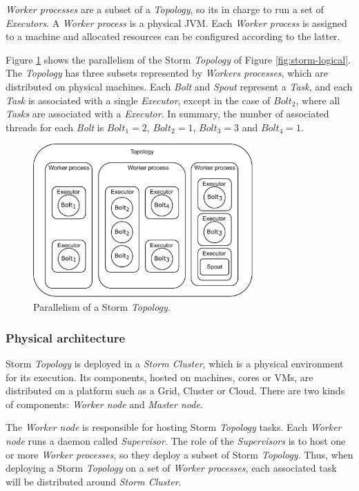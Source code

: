 \textit{Worker processes} are a subset of a \textit{Topology}, so its in charge to run a set of \textit{Executors}. A \textit{Worker process} is a physical JVM. Each \textit{Worker process} is assigned to a machine and allocated resources can be configured according to the latter.

Figure \ref{fig:storm-parallelism} shows the parallelism of the Storm \textit{Topology} of Figure \ref{fig:storm-logical}. The \textit{Topology} has three subsets represented by \textit{Workers processes}, which are distributed on physical machines. Each \textit{Bolt} and \textit{Spout} represent a \textit{Task}, and each \textit{Task} is associated with a single \textit{Executor}, except in the case of $Bolt_2$, where all \textit{Tasks} are associated with a \textit{Executor}. In summary, the number of associated threads for each \textit{Bolt} is $Bolt_1 = 2$, $Bolt_2 = 1$, $Bolt_3 = 3$ and $Bolt_4 = 1$.

\begin{figure}[!ht]
    \centering
    \includegraphics[width=0.75\textwidth]{figures/concepts/Storm-Logical-Parallelism.pdf}
    \caption{Parallelism of a Storm \textit{Topology}.}
    \label{fig:storm-parallelism}
\end{figure}

\subsubsection{Physical architecture}

Storm \textit{Topology} is deployed in a \textit{Storm Cluster}, which is a physical environment for its execution. Its components, hosted on machines, cores or VMs, are distributed on a platform such as a Grid, Cluster or Cloud. There are two kinds of components: \textit{Worker node} and  \textit{Master node}.

The \textit{Worker node} is responsible for hosting Storm \textit{Topology} tasks. Each \textit{Worker node} runs a daemon called \textit{Supervisor}. The role of the \textit{Supervisors} is to host one or more \textit{Worker processes}, so they deploy a subset of Storm \textit{Topology}. Thus, when deploying a Storm \textit{Topology} on a set of \textit{Worker processes}, each associated task will be distributed around \textit{Storm Cluster}.

